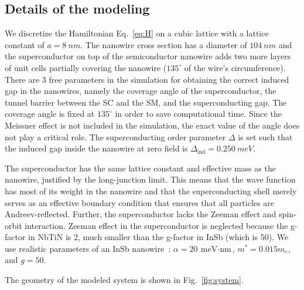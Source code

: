 \subsection{Details of the modeling}

We discretize the Hamiltonian Eq.~\eqref{eq:H} on a cubic lattice with a lattice constant of $a=\SI{8}{nm}$.
The nanowire cross section has a diameter of $\SI{104}{nm}$ and the superconductor on top of the semiconductor nanowire adds two more layers of unit cells partially covering the nanowire ($135^{\circ}$ of the wire's circumference).
There are 3 free parameters in the simulation for obtaining the correct induced gap in the nanowires, namely the coverage angle of the superconductor, the tunnel barrier between the SC and the SM, and the superconducting gap.
The coverage angle is fixed at $135^{\circ}$ in order to save computational time.
Since the Meissner effect is not included in the simulation, the exact value of the angle does not play a critical role.
The superconducting order parameter $\Delta$ is set such that the induced gap inside the nanowire at zero field is $\Delta_\textrm{ind} = \SI{0.250}{meV}$.

The superconductor has the same lattice constant and effective mass as the nanowire, justified by the long-junction limit.
This means that the wave function has most of its weight in the nanowire and that the superconducting shell merely serves as an effective boundary condition that ensures that all particles are Andreev-reflected.
Further, the superconductor lacks the Zeeman effect and spin-orbit interaction.
Zeeman effect in the superconductor is neglected because the g-factor in NbTiN is 2, much smaller than the g-factor in InSb (which is 50).
We use realistic parameters of an InSb nanowire~\cite{Mourik2012}:  $\alpha=\SI{20}{\meV\cdot\nm}$, $m^{*}=0.015 m_e$, and $g=50$.

The geometry of the modeled system is shown in Fig.~\ref{fig:system}.


